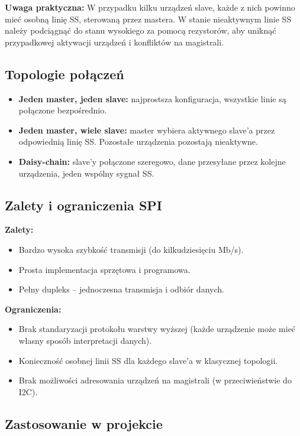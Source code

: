 \documentclass[a4paper,12pt]{report}
\begin{document}
\textbf{Uwaga praktyczna:} W przypadku kilku urządzeń slave, każde z nich powinno mieć osobną linię SS, sterowaną przez mastera. W stanie nieaktywnym linie SS należy podciągnąć do stanu wysokiego za pomocą rezystorów, aby uniknąć przypadkowej aktywacji urządzeń i konfliktów na magistrali.

\subsection*{Topologie połączeń}

\begin{itemize}
    \item \textbf{Jeden master, jeden slave:} najprostsza konfiguracja, wszystkie linie są połączone bezpośrednio.
    \item \textbf{Jeden master, wiele slave:} master wybiera aktywnego slave'a przez odpowiednią linię SS. Pozostałe urządzenia pozostają nieaktywne.
    \item \textbf{Daisy-chain:} slave'y połączone szeregowo, dane przesyłane przez kolejne urządzenia, jeden wspólny sygnał SS.
\end{itemize}

\subsection*{Zalety i ograniczenia SPI}

\textbf{Zalety:}
\begin{itemize}
    \item Bardzo wysoka szybkość transmisji (do kilkudziesięciu Mb/s).
    \item Prosta implementacja sprzętowa i programowa.
    \item Pełny dupleks – jednoczesna transmisja i odbiór danych.
\end{itemize}

\textbf{Ograniczenia:}
\begin{itemize}
    \item Brak standaryzacji protokołu warstwy wyższej (każde urządzenie może mieć własny sposób interpretacji danych).
    \item Konieczność osobnej linii SS dla każdego slave'a w klasycznej topologii.
    \item Brak możliwości adresowania urządzeń na magistrali (w przeciwieństwie do I2C).
\end{itemize}

\subsection*{Zastosowanie w projekcie}
\end{document}
